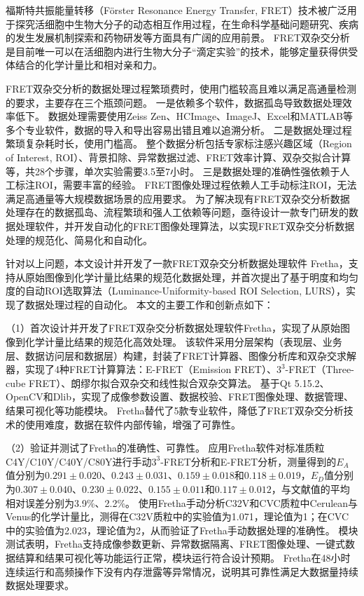 \begin{cabstract}
福斯特共振能量转移（Förster Resonance Energy Transfer, FRET）技术被广泛用于探究活细胞中生物大分子的动态相互作用过程，在生命科学基础问题研究、疾病的发生发展机制探索和药物研发等方面具有广阔的应用前景。
FRET双杂交分析是目前唯一可以在活细胞内进行生物大分子“滴定实验”的技术，能够定量获得供受体结合的化学计量比和相对亲和力。

FRET双杂交分析的数据处理过程繁琐费时，使用门槛较高且难以满足高通量检测的要求，主要存在三个瓶颈问题。
一是依赖多个软件，数据孤岛导致数据处理效率低下。
数据处理需要使用Zeiss Zen、HCImage、ImageJ、Excel和MATLAB等多个专业软件，数据的导入和导出容易出错且难以追溯分析。
二是数据处理过程繁琐复杂耗时长，使用门槛高。
整个数据分析包括专家标注感兴趣区域（Region of Interest, ROI）、背景扣除、异常数据过滤、FRET效率计算、双杂交拟合计算等，共28个步骤，单次实验需要3.5至7小时。
三是数据处理的准确性强依赖于人工标注ROI，需要丰富的经验。
FRET图像处理过程依赖人工手动标注ROI，无法满足高通量等大规模数据场景的应用要求。
为了解决现有FRET双杂交分析数据处理存在的数据孤岛、流程繁琐和强人工依赖等问题，亟待设计一款专门研发的数据处理软件，并开发自动化的FRET图像处理算法，以实现FRET双杂交分析数据处理的规范化、简易化和自动化。

针对以上问题，本文设计并开发了一款FRET双杂交分析数据处理软件 Fretha，支持从原始图像到化学计量比结果的规范化数据处理，并首次提出了基于明度和均匀度的自动ROI选取算法（Luminance-Uniformity-based ROI Selection, LURS），实现了数据处理过程的自动化。
本文的主要工作和创新点如下：

（1）首次设计并开发了FRET双杂交分析数据处理软件Fretha，实现了从原始图像到化学计量比结果的规范化高效处理。
该软件采用分层架构（表现层、业务层、数据访问层和数据层）构建，封装了FRET计算器、图像分析库和双杂交求解器，实现了4种FRET计算算法：E-FRET（Emission FRET）、$3^3$-FRET（Three-cube FRET）、朗缪尔拟合双杂交和线性拟合双杂交算法。
基于Qt 5.15.2、OpenCV和Dlib，实现了成像参数设置、数据校验、FRET图像处理、数据管理、结果可视化等功能模块。
Fretha替代了5款专业软件，降低了FRET双杂交分析技术的使用难度，数据在软件内部传输，增强了可靠性。

（2）验证并测试了Fretha的准确性、可靠性。
应用Fretha软件对标准质粒C4Y/C10Y/C40Y/C80Y进行手动$3^3$-FRET分析和E-FRET分析，测量得到的$E_{A}$值分别为$0.291\pm0.020$、$0.243\pm0.031$、$0.159\pm0.018$和$0.118\pm0.019$，$E_{D}$值分别为$0.307\pm0.040$、$0.230\pm0.022$、$0.155\pm0.011$和$0.117\pm0.012$，与文献值的平均相对误差分别为3.9\%、2.2\%。
使用Fretha手动分析C32V和CVC质粒中Cerulean与Venus的化学计量比，测得在C32V质粒中的实验值为1.071，理论值为1；在CVC中的实验值为2.023，理论值为2，从而验证了Fretha手动数据处理的准确性。
模块测试表明，Fretha支持成像参数更新、异常数据隔离、FRET图像处理、一键式数据结算和结果可视化等功能运行正常，模块运行符合设计预期。
Fretha在48小时连续运行和高频操作下没有内存泄露等异常情况，说明其可靠性满足大数据量持续数据处理要求。


\end{cabstract}
